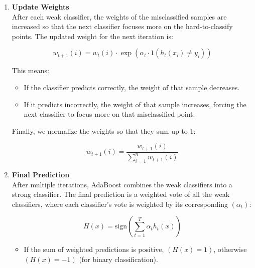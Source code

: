 \documentclass[12pt]{book}
\providecommand{\tightlist}{%
  \setlength{\itemsep}{0pt}\setlength{\parskip}{0pt}}
\begin{document}
\begin{enumerate}
  \begin{itemize}
  \tightlist
  \item
    If the classifier is perfect, \(( \epsilon_t = 0 )\), then
    \(( \alpha_t )\) becomes large, emphasizing that classifier.
  \item
    If \(( \epsilon_t = 0.5 )\) (random guessing), \(( \alpha_t = 0 )\),
    meaning that classifier contributes nothing.
  \end{itemize}
\item
  \textbf{Update Weights}\\
  After each weak classifier, the weights of the misclassified samples
  are increased so that the next classifier focuses more on the
  hard-to-classify points. The updated weight for the next iteration is:

  \[
  w_{t+1}(i) = w_t(i) \cdot \exp(\alpha_t \cdot {1}(h_t(x_i) \neq y_i))
  \]

  This means:

  \begin{itemize}
  \tightlist
  \item
    If the classifier predicts correctly, the weight of that sample
    decreases.
  \item
    If it predicts incorrectly, the weight of that sample increases,
    forcing the next classifier to focus more on that misclassified
    point.
  \end{itemize}

  Finally, we normalize the weights so that they sum up to 1:

  \[
  w_{t+1}(i) = \frac{w_{t+1}(i)}{\sum_{i=1}^{n} w_{t+1}(i)}
  \]
\item
  \textbf{Final Prediction}\\
  After multiple iterations, AdaBoost combines the weak classifiers into
  a strong classifier. The final prediction is a weighted vote of all
  the weak classifiers, where each classifier's vote is weighted by its
  corresponding \(( \alpha_t )\):

  \[
  H(x) = \text{sign}\left(\sum_{t=1}^{T} \alpha_t h_t(x)\right)
  \]

  \begin{itemize}
  \tightlist
  \item
    If the sum of weighted predictions is positive, \((H(x) = 1)\),
    otherwise \((H(x) = -1)\) (for binary classification).
  \end{itemize}
\end{enumerate}
\end{document}
